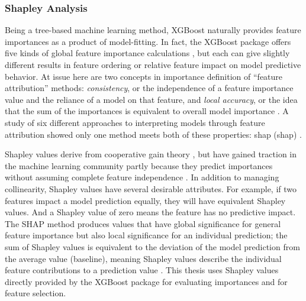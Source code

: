 \subsubsection{Shapley Analysis}\label{ch3:xgb_shapley}
Being a tree-based machine learning method, XGBoost naturally provides feature importances as a product of model-fitting. In fact, the XGBoost package offers five kinds of global feature importance calculations \citep{xgboost_developers_xgboost_2020}, but each can give slightly different results in feature ordering or relative feature impact on model predictive behavior. At issue here are two concepts in importance definition of ``feature attribution'' methods: \textit{consistency}, or the independence of a feature importance value and the reliance of a model on that feature, and \textit{local accuracy}, or the idea that the sum of the importances is equivalent to overall model importance \citep{lundberg_interpretable_2020}. A study of six different approaches to interpreting models through feature attribution showed only one method meets both of these properties: \acrlong{shap} (\acrshort{shap}) \citep{lundberg_consistent_2019}.

Shapley values derive from cooperative gain theory \citep{shapley_value_1997}, but have gained traction in the machine learning community partly because they predict importances without assuming complete feature independence \citep{lundberg_unified_2017}. In addition to managing collinearity, Shapley values have several desirable attributes. For example, if two features impact a model prediction equally, they will have equivalent Shapley values. And a Shapley value of zero means the feature has no predictive impact. The SHAP method produces values that have global significance for general feature importance but also local significance for an individual prediction; the sum of Shapley values is equivalent to the deviation of the model prediction from the average value (baseline), meaning Shapley values describe the individual feature contributions to a prediction value \citep{lundberg_unified_2017}. This thesis uses Shapley values directly provided by the XGBoost package \citep{xgboost_developers_xgboost_2020} for evaluating importances and for feature selection.

